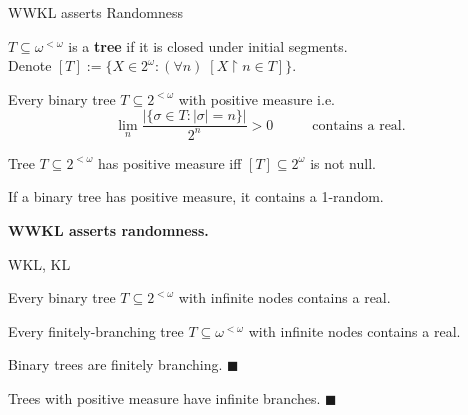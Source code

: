 \begin{frame}{WWKL asserts Randomness}
  \begin{notation*}
    $T\subseteq\omega^{<\omega}$ is a \textbf{tree} if it is closed under
    initial segments.\\
    Denote $[T]:= \{X\in2^\omega: (\forall n)\; [X\restriction n \in T]\}$.
  \end{notation*}
  \begin{thm*}
    Every binary tree $T\subseteq 2^{<\omega}$ with positive measure i.e.
    \[\lim_n \frac{|\{\sigma\in T: |\sigma|=n\}|}{2^n}
    >0\;\;\;\;\;\;\;\;\;\;
    \text{contains a real.}\]
  \end{thm*}
  \begin{fact}
    Tree $T\subseteq2^{<\omega}$ has positive measure iff
    $[T]\subseteq2^\omega$ is not null.
  \end{fact}
  \begin{coro}
    If a binary tree has positive measure, it contains a 1-random.
  \end{coro}

  \textbf{WWKL asserts randomness.}
\end{frame}

\begin{frame}{WKL, KL}
  \begin{thm*}
    Every binary tree $T\subseteq2^{<\omega}$ with infinite nodes contains
    a real.
  \end{thm*}

  \begin{thm*}
    Every finitely-branching tree $T\subseteq\omega^{<\omega}$ with
    infinite nodes contains a real.
  \end{thm*}

  \begin{observe*}
    Binary trees are finitely branching. $\blacksquare$
  \end{observe*}

  \begin{observe*}
    Trees with positive measure have infinite branches. $\blacksquare$
  \end{observe*}
\end{frame}

